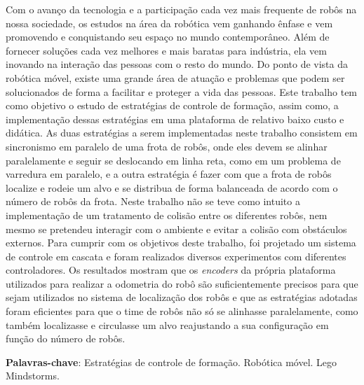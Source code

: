 %
%

\begin{resumo}

Com o avanço da tecnologia e a participação cada vez mais frequente de robôs na nossa sociedade, os estudos na área da robótica vem ganhando ênfase e vem promovendo e conquistando seu espaço no mundo contemporâneo. Além de fornecer soluções cada vez melhores e mais baratas para indústria, ela vem inovando na interação das pessoas com o resto do mundo. Do ponto de vista da robótica móvel, existe uma grande área de atuação e problemas que podem ser solucionados de forma a facilitar e proteger a vida das pessoas. Este trabalho tem como objetivo o estudo de estratégias de controle de formação, assim como, a implementação dessas estratégias em uma plataforma de relativo baixo custo e didática. As duas estratégias a serem implementadas neste trabalho consistem em sincronismo em paralelo de uma frota de robôs, onde eles devem se alinhar paralelamente e seguir se deslocando em linha reta, como em um problema de varredura em paralelo, e a outra estratégia é fazer com que a frota de robôs localize e rodeie um alvo e se distribua de forma balanceada de acordo com o número de robôs da frota. Neste trabalho não se teve como intuito a implementação de um tratamento de colisão entre os diferentes robôs, nem mesmo se pretendeu interagir com o ambiente e evitar a  colisão com obstáculos externos. Para cumprir com os objetivos deste trabalho, foi projetado um sistema de controle em cascata e foram realizados diversos experimentos com diferentes controladores. Os resultados mostram que os \emph{encoders} da própria plataforma utilizados para realizar a odometria do robô são suficientemente precisos para que sejam utilizados no sistema de localização dos robôs e que as estratégias adotadas foram eficientes para que o time de robôs não só se alinhasse paralelamente, como também localizasse e circulasse um alvo reajustando a sua configuração em função do número de robôs.

\textbf{Palavras-chave}: Estratégias de controle de formação. Robótica móvel. Lego Mindstorms. 
\end{resumo}
